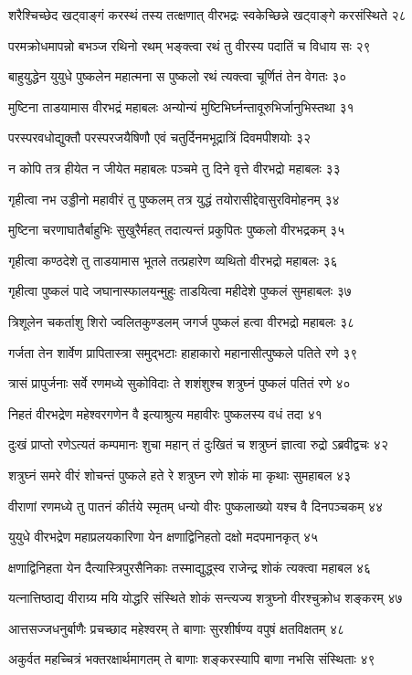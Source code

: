 शरैश्चिच्छेद खट्वाङ्गं करस्थं तस्य तत्क्षणात्
वीरभद्रः स्वकेच्छिन्ने खट्वाङ्गे करसंस्थिते २८

परमक्रोधमापन्नो बभञ्ज रथिनो रथम्
भङ्क्त्वा रथं तु वीरस्य पदातिं च विधाय सः २९

बाहुयुद्धेन युयुधे पुष्कलेन महात्मना
स पुष्कलो रथं त्यक्त्वा चूर्णितं तेन वेगतः ३०

मुष्टिना ताडयामास वीरभद्रं महाबलः
अन्योन्यं मुष्टिभिर्घ्नन्तावूरुभिर्जानुभिस्तथा ३१

परस्परवधोद्युक्तौ परस्परजयैषिणौ
एवं चतुर्दिनमभूद्रात्रिं दिवमपीशयोः ३२

न कोपि तत्र हीयेत न जीयेत महाबलः
पञ्चमे तु दिने वृत्ते वीरभद्रो महाबलः ३३

गृहीत्वा नभ उड्डीनो महावीरं तु पुष्कलम्
तत्र युद्धं तयोरासीद्देवासुरविमोहनम् ३४

मुष्टिना चरणाघातैर्बाहुभिः सुखुरैर्महत्
तदात्यन्तं प्रकुपितः पुष्कलो वीरभद्रकम् ३५

गृहीत्वा कण्ठदेशे तु ताडयामास भूतले
तत्प्रहारेण व्यथितो वीरभद्रो महाबलः ३६

गृहीत्वा पुष्कलं पादे जघानास्फालयन्मुहुः
ताडयित्वा महीदेशे पुष्कलं सुमहाबलः ३७

त्रिशूलेन चकर्ताशु शिरो ज्वलितकुण्डलम्
जगर्ज पुष्कलं हत्वा वीरभद्रो महाबलः ३८

गर्जता तेन शार्वेण प्रापितास्त्रा समुद्भटाः
हाहाकारो महानासीत्पुष्कले पतिते रणे ३९

त्रासं प्रापुर्जनाः सर्वे रणमध्ये सुकोविदाः
ते शशंशुश्च शत्रुघ्नं पुष्कलं पतितं रणे ४०

निहतं वीरभद्रेण महेश्वरगणेन वै
इत्याश्रुत्य महावीरः पुष्कलस्य वधं तदा ४१

दुःखं प्राप्तो रणेऽत्यतं कम्पमानः शुचा महान्
तं दुःखितं च शत्रुघ्नं ज्ञात्वा रुद्रो ऽब्रवीद्वचः ४२

शत्रुघ्नं समरे वीरं शोचन्तं पुष्कले हते
रे शत्रुघ्न रणे शोकं मा कृथाः सुमहाबल ४३

वीराणां रणमध्ये तु पातनं कीर्तये स्मृतम्
धन्यो वीरः पुष्कलाख्यो यश्च वै दिनपञ्चकम् ४४

युयुधे वीरभद्रेण महाप्रलयकारिणा
येन क्षणाद्विनिहतो दक्षो मदपमानकृत् ४५

क्षणाद्विनिहता येन दैत्यास्त्रिपुरसैनिकाः
तस्माद्युद्ध्स्व राजेन्द्र शोकं त्यक्त्वा महाबल ४६

यत्नात्तिष्ठाद्य वीराग्र्य मयि योद्धरि संस्थिते
शोकं सन्त्यज्य शत्रुघ्नो वीरश्चुक्रोध शङ्करम् ४७

आत्तसज्जधनुर्बाणैः प्रचच्छाद महेश्वरम्
ते बाणाः सुरशीर्षण्य वपुषं क्षतविक्षतम् ४८

अकुर्वत महच्चित्रं भक्तरक्षार्थमागतम्
ते बाणाः शङ्करस्यापि बाणा नभसि संस्थिताः ४९

